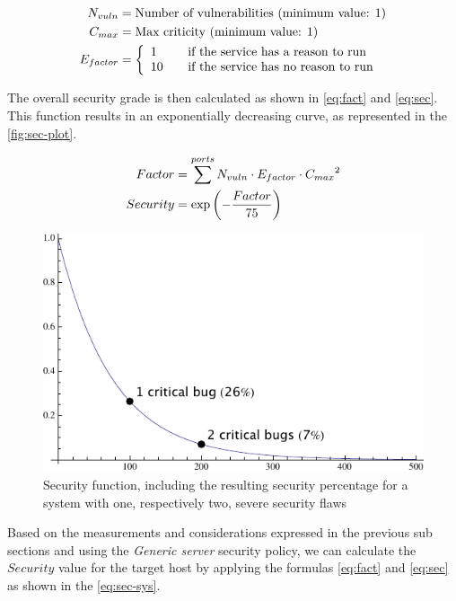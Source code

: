 \documentclass[10pt,a4paper,twoside,onecolumn]{article}
\begin{document}
\vspace{-.5cm}
\begin{align*}
	N_{vuln} &= \text{Number of vulnerabilities (minimum value: 1)} \\
	 C_{max} &= \text{Max criticity (minimum value: 1)} \\
  E_{factor} &= \left\{
		\begin{array}{l l}
			1 & \quad \text{if the service has a reason to run}\\
		   10 & \quad \text{if the service has no reason to run}\\
		\end{array}
	\right.
\end{align*}

The overall security grade is then calculated as shown in \autoref{eq:fact} and \ref{eq:sec}. This function results in an exponentially decreasing curve, as represented in the \autoref{fig:sec-plot}.

\vspace{-.5cm}
\begin{align}
	\label{eq:fact}
Factor &= \sum\limits^{ports}{N_{vuln} \cdot E_{factor} \cdot {C_{max}}^2}\\
	\label{eq:sec}
   Security &= \exp\left(-{Factor \over 75}\right)
\end{align}

\begin{figure}[ht]
	\centering
	\includegraphics[width=.6\textwidth]{images/sec-plot}
	\caption{Security function, including the resulting security percentage for a system with one, respectively two, severe security flaws}
	\label{fig:sec-plot}
\end{figure}

Based on the measurements and considerations expressed in the previous sub sections and using the \emph{Generic server} security policy, we can calculate the $Security$ value for the target host by applying the formulas \ref{eq:fact} and \ref{eq:sec} as shown in the \autoref{eq:sec-sys}.
\end{document}
